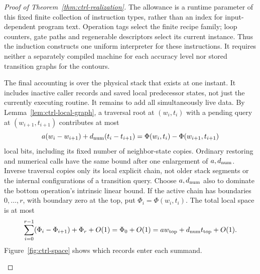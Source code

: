 \documentclass[11pt]{article}
\numberwithin{equation}{section}
\theoremstyle{definition}
\theoremstyle{remark}
\begin{document}
\begin{proof}[Proof of Theorem~\ref{thm:ctrl-realization}]
The allowance is a runtime parameter of this fixed finite collection of
instruction types, rather than an index for input-dependent program
text.  Operation tags select the finite recipe family; loop counters,
gate paths and regenerable descriptors select its current instance.
Thus the induction constructs one uniform interpreter for these
instructions.  It requires neither a separately compiled machine for
each accuracy level nor stored transition graphs for the contours.

The final accounting is over the physical stack that exists at one instant. It includes inactive caller records and saved local predecessor states, not just the currently executing routine. It remains to add all simultaneously live data.  By
Lemma~\ref{lem:ctrl-local-graph}, a traversal root at $(w_i,t_i)$ with a
pending query at $(w_{i+1},t_{i+1})$ contributes at most
\begin{equation}\label{eq:ctrl-stack-segment}
 {a}(w_i-w_{i+1})+{d_{\rm num}}(t_i-t_{i+1})
 =\Phi(w_i,t_i)-\Phi(w_{i+1},t_{i+1})
\end{equation}
local bits, including its fixed number of neighbor-state copies.
Ordinary restoring and numerical calls have the same bound after one
enlargement of ${a},{d_{\rm num}}$.  Inverse traversal copies only its local explicit
chain, not older stack segments or the internal configurations of a
transition query.  Choose ${a},{d_{\rm num}}$ also to dominate the bottom operation's
intrinsic linear bound.  If the active chain has boundaries
$0,\ldots,r$, with boundary zero at the top, put
$\Phi_i=\Phi(w_i,t_i)$.  The total local space is at most
\[
 \sum_{i=0}^{r-1}(\Phi_i-\Phi_{i+1})+\Phi_r+O(1)
 =\Phi_0+O(1)
 ={a}w_{\mathrm{top}}+{d_{\rm num}}t_{\mathrm{top}}+O(1).
\]
Figure~\ref{fig:ctrl-space} shows which records enter each summand.


\begin{figure}[t]
\centering
{}
\end{figure}
\end{proof}
\end{document}
